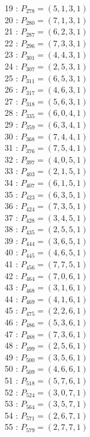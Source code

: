 \documentclass{article}
\begin{document}
{\begin{multicols}{2}
19 : $P_{278}=( 5, 1, 3, 1 )$\\
20 : $P_{280}=( 7, 1, 3, 1 )$\\
21 : $P_{287}=( 6, 2, 3, 1 )$\\
22 : $P_{296}=( 7, 3, 3, 1 )$\\
23 : $P_{301}=( 4, 4, 3, 1 )$\\
24 : $P_{307}=( 2, 5, 3, 1 )$\\
25 : $P_{311}=( 6, 5, 3, 1 )$\\
26 : $P_{317}=( 4, 6, 3, 1 )$\\
27 : $P_{318}=( 5, 6, 3, 1 )$\\
28 : $P_{335}=( 6, 0, 4, 1 )$\\
29 : $P_{359}=( 6, 3, 4, 1 )$\\
30 : $P_{368}=( 7, 4, 4, 1 )$\\
31 : $P_{376}=( 7, 5, 4, 1 )$\\
32 : $P_{397}=( 4, 0, 5, 1 )$\\
33 : $P_{403}=( 2, 1, 5, 1 )$\\
34 : $P_{407}=( 6, 1, 5, 1 )$\\
35 : $P_{423}=( 6, 3, 5, 1 )$\\
36 : $P_{424}=( 7, 3, 5, 1 )$\\
37 : $P_{428}=( 3, 4, 5, 1 )$\\
38 : $P_{435}=( 2, 5, 5, 1 )$\\
39 : $P_{444}=( 3, 6, 5, 1 )$\\
40 : $P_{445}=( 4, 6, 5, 1 )$\\
41 : $P_{456}=( 7, 7, 5, 1 )$\\
42 : $P_{464}=( 7, 0, 6, 1 )$\\
43 : $P_{468}=( 3, 1, 6, 1 )$\\
44 : $P_{469}=( 4, 1, 6, 1 )$\\
45 : $P_{475}=( 2, 2, 6, 1 )$\\
46 : $P_{486}=( 5, 3, 6, 1 )$\\
47 : $P_{488}=( 7, 3, 6, 1 )$\\
48 : $P_{499}=( 2, 5, 6, 1 )$\\
49 : $P_{500}=( 3, 5, 6, 1 )$\\
50 : $P_{509}=( 4, 6, 6, 1 )$\\
51 : $P_{518}=( 5, 7, 6, 1 )$\\
52 : $P_{524}=( 3, 0, 7, 1 )$\\
53 : $P_{564}=( 3, 5, 7, 1 )$\\
54 : $P_{571}=( 2, 6, 7, 1 )$\\
55 : $P_{579}=( 2, 7, 7, 1 )$\\
\end{multicols}
}
\end{document}

